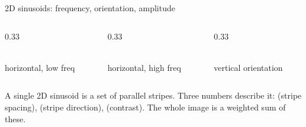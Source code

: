\documentclass[10pt,aspectratio=169]{beamer}
\begin{document}
\begin{frame}{2D sinusoids: frequency, orientation, amplitude}
  \begin{columns}[T]
    \begin{column}{0.33\textwidth}\begin{center}
      \\{\scriptsize horizontal, low freq}
    \end{center}\end{column}
    \begin{column}{0.33\textwidth}\begin{center}
      \\{\scriptsize horizontal, high freq}
    \end{center}\end{column}
    \begin{column}{0.33\textwidth}\begin{center}
      \\{\scriptsize vertical orientation}
    \end{center}\end{column}
  \end{columns}
  \vspace{4pt}
  A single 2D sinusoid is a set of parallel stripes. Three numbers describe it:
   (stripe spacing),  (stripe direction), 
  (contrast). The whole image is a weighted sum of these.
\end{frame}
\end{document}
